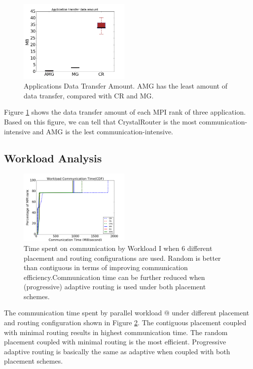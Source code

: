 \documentclass[conference,compsoc]{IEEEtran}
\makeatletter
\newcommand{\Rmnum}[1]{\expandafter\@slowromancap\romannumeral #1@}
\makeatother
\begin{document}
\begin{figure}[h!]
  \centering
  \includegraphics[width = 0.48\textwidth ]{data_amount}
  \caption{Applications Data Transfer Amount. AMG has the least amount of data transfer, compared with CR and MG.}
  \label{fig:3app-data-amount}
\end{figure}

Figure \ref{fig:3app-data-amount} shows the data transfer amount of each MPI rank of three application. Based on this figure, we can tell that CrystalRouter is the most communication-intensive and AMG is the lest communication-intensive. 

\subsection{Workload Analysis}
\begin{figure}[h!]
  \centering
  \includegraphics[width = 0.48\textwidth ]{wkld/wkld-commtime}
  \caption{Time spent on communication by Workload I when 6 different placement and routing configurations are used. Random is better than contiguous in terms of improving communication efficiency.Communication time can be further reduced when (progressive) adaptive routing is used under both placement schemes. }
  \label{fig:wkld-commtime}
\end{figure}

The communication time spent by parallel workload \Rmnum{1} under different placement and routing configuration shown in Figure \ref{fig:wkld-commtime}. The contiguous placement coupled with minimal routing results in highest communication time. The random placement coupled with minimal routing is the most efficient. Progressive adaptive routing is basically the same as adaptive when coupled with both placement schemes.
\end{document}
